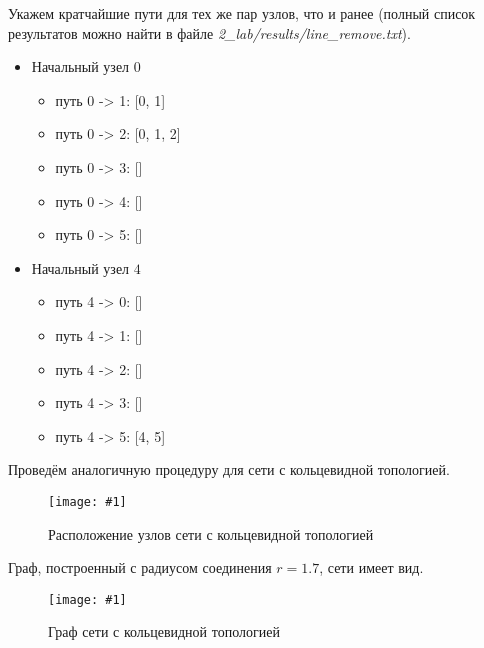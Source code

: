 \documentclass[a4paper,12pt]{article}
\newcommand{\plot}[3]{
    \begin{figure}[H]
        \begin{center}
            \texttt{[image: \#1]}
            \caption{#2}
            \label{#3}
        \end{center}
    \end{figure}
}
\begin{document}
    Укажем кратчайшие пути для тех же пар узлов, что и ранее (полный список результатов можно найти в файле \textsl{2\_lab/results/line\_remove.txt}).
    \begin{itemize}
        \item Начальный узел $ 0 $
        \begin{itemize}
            \item путь 0 -> 1: [0, 1]
            \item путь 0 -> 2: [0, 1, 2]
            \item путь 0 -> 3: []
            \item путь 0 -> 4: []
            \item путь 0 -> 5: []
        \end{itemize} 
        \item Начальный узел $ 4 $
        \begin{itemize}
            \item путь 4 -> 0: []
            \item путь 4 -> 1: []
            \item путь 4 -> 2: []
            \item путь 4 -> 3: []
            \item путь 4 -> 5: [4, 5]
        \end{itemize} 
    \end{itemize}

    Проведём аналогичную процедуру для сети с кольцевидной топологией.
    \plot{full_ring_points}{Расположение узлов сети с кольцевидной топологией}{p:fullRingPoints}

    Граф, построенный с радиусом соединения $ r = 1.7 $, сети имеет вид.
    \plot{full_ring}{Граф сети с кольцевидной топологией}{p:fullRing}
\end{document}
